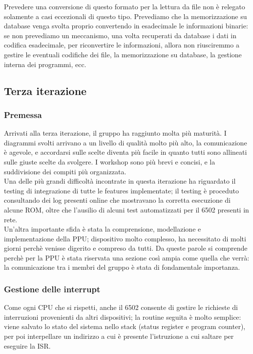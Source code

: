 \documentclass[11pt]{article}
\begin{document}
Prevedere una conversione di questo formato per la lettura da file non è relegato solamente a casi eccezionali di questo tipo. Prevediamo che la memorizzazione su database venga svolta proprio convertendo in esadecimale le informazioni binarie: se non prevediamo un meccanismo, una volta recuperati da database i dati in codifica esadecimale, per riconvertire le informazioni, allora non riusciremmo a gestire le eventuali codifiche dei file, la memorizzazione su database, la gestione interna dei programmi, ecc.

\clearpage
\subsection{Terza iterazione}
\subsubsection{Premessa}
Arrivati alla terza iterazione, il gruppo ha raggiunto molta più maturità. I diagrammi svolti arrivano a un livello di qualità molto più alto, la comunicazione è agevole, e accordarsi sulle scelte diventa più facile in quanto tutti sono allineati sulle giuste scelte da svolgere. I workshop sono più brevi e concisi, e la suddivisione dei compiti più organizzata.\\
Una delle più grandi difficoltà incontrate in questa iterazione ha riguardato il testing di integrazione di tutte le features implementate; il testing è proceduto consultando dei log presenti online che mostravano la corretta esecuzione di alcune ROM, oltre che l'ausilio di alcuni test automatizzati per il 6502 presenti in rete.\\
Un'altra importante sfida è stata la comprensione, modellazione e implementazione della PPU; dispositivo molto complesso, ha necessitato di molti giorni perchè venisse digerito e compreso da tutti. Da queste parole si comprende perchè per la PPU è stata riservata una sezione così ampia come quella che verrà: la comunicazione tra i membri del gruppo è stata di fondamentale importanza. 

\subsubsection{Gestione delle interrupt}
Come ogni CPU che si rispetti, anche il 6502 consente di gestire le richieste di interruzioni provenienti da altri dispositivi; la routine seguita è molto semplice: viene salvato lo stato del sistema nello stack (status register e program counter), per poi interpellare un indirizzo a cui è presente l'istruzione a cui saltare per eseguire la ISR.
\end{document}
